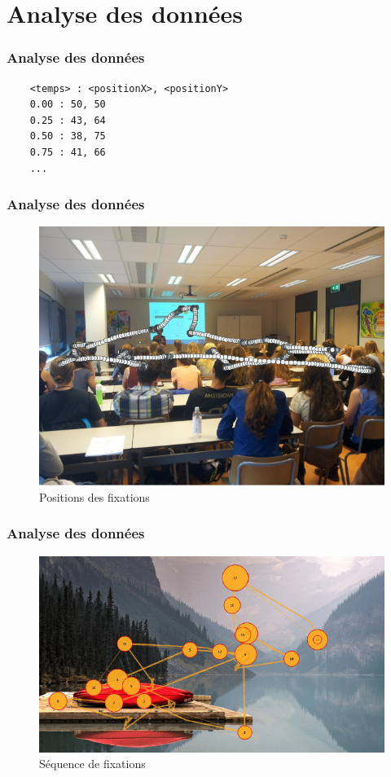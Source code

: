 \documentclass{beamer}
\begin{document}
\section{Analyse des données}
\begin{frame}[fragile]
  \frametitle{Analyse des données}
  \begin{lstlisting}
    <temps> : <positionX>, <positionY>
    0.00 : 50, 50
    0.25 : 43, 64
    0.50 : 38, 75
    0.75 : 41, 66
    ...
  \end{lstlisting}
\end{frame}
\begin{frame}
  \frametitle{Analyse des données}
  \begin{figure}
    \includegraphics[height=0.5\textwidth]{raw.png}
    \caption{Positions des fixations}
  \end{figure}
\end{frame}
\begin{frame}
  \frametitle{Analyse des données}
  \begin{figure}
    \includegraphics[height=0.5\textwidth]{sequence.png}
    \caption{Séquence de fixations}
  \end{figure}
\end{frame}
\end{document}
